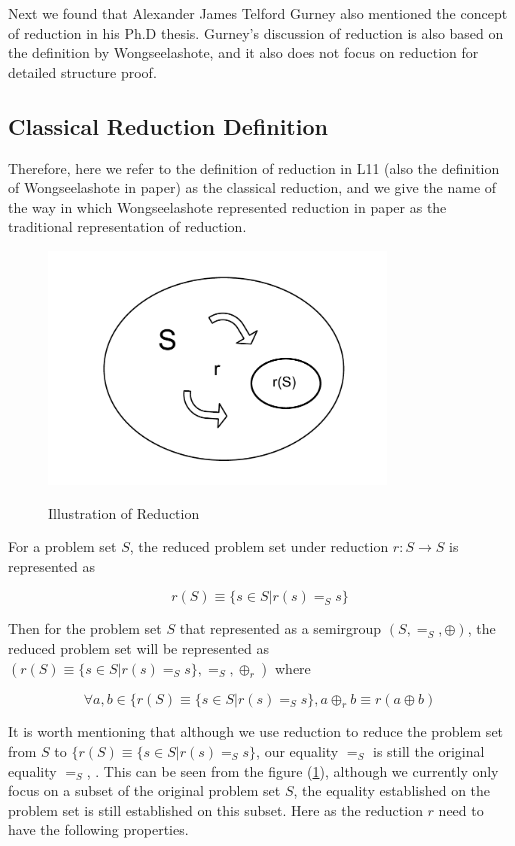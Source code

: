 \documentclass[a4paper,12pt,twoside,openright]{report}
\newcommand{\e}[2]{
\begin{equation}
  \label{#1} 
  #2
\end{equation}
}
\begin{document}
Next we found that Alexander James Telford Gurney also mentioned the concept of reduction in his Ph.D thesis\cite{gurney_construction_2010}. Gurney's discussion of reduction is also based on the definition by Wongseelashote, and it also does not focus on reduction for detailed structure proof.

\subsection{Classical Reduction Definition}
Therefore, here we refer to the definition of reduction in L11 (also the definition of Wongseelashote in paper) as the classical reduction, and we give the name of the way in which Wongseelashote represented reduction in paper as the traditional representation of reduction.
\begin{figure}[H]
\centering
\includegraphics[width=0.8\textwidth]{reduction.pdf}
\label{reduction}
\caption{Illustration of Reduction}
\end{figure}
For a problem set $S$, the reduced problem set under reduction $r: S \rightarrow S$ is represented as 
\e{r:def:traditional}{r(S) \equiv \{s \in S | r(s) =_S s\}}
Then for the problem set $S$ that represented as a semirgroup $(S,=_S,\oplus)$, the reduced problem set will be represented as $({r(S) \equiv \{s \in S | r(s) =_S s\}},=_S,\oplus_r)$ where 
\e{r:def:binary_operator}{\forall a, b \in \{r(S) \equiv \{s \in S | r(s) =_S s\}, a \oplus_r b \equiv r(a \oplus b)}
It is worth mentioning that although we use reduction to reduce the problem set from $S$ to $\{r(S) \equiv \{s \in S | r(s) =_S s\}$, our equality $=_S$ is still the original equality $=_S$, .
This can be seen from the figure (\ref{reduction}), although we currently only focus on a subset of the original problem set $S$, the equality established on the problem set is still established on this subset.
Here as the reduction $r$ need to have the following properties.
\end{document}
